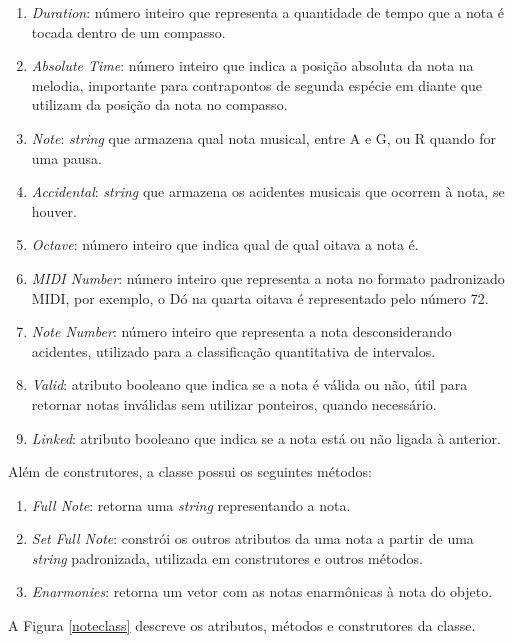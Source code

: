       \begin{enumerate}
        \item \textit{Duration}: número inteiro que representa a quantidade de tempo que a nota é tocada dentro de um compasso.
        \item \textit{Absolute Time}: número inteiro que indica a posição absoluta da nota na melodia, importante para contrapontos de segunda espécie em diante que utilizam da posição da nota no compasso.
        \item \textit{Note}: \textit{string} que armazena qual nota musical, entre A e G, ou R quando for uma pausa.
        \item \textit{Accidental}: \textit{string} que armazena os acidentes musicais que ocorrem à nota, se houver.
        \item \textit{Octave}: número inteiro que indica qual de qual oitava a nota é.
        \item \textit{MIDI Number}: número inteiro que representa a nota no formato padronizado MIDI, por exemplo, o Dó na quarta oitava é representado pelo número 72.
        \item \textit{Note Number}: número inteiro que representa a nota desconsiderando acidentes, utilizado para a classificação quantitativa de intervalos.
        \item \textit{Valid}: atributo booleano que indica se a nota é válida ou não, útil para retornar notas inválidas sem utilizar ponteiros, quando necessário.
        \item \textit{Linked}: atributo booleano que indica se a nota está ou não ligada à anterior.
      \end{enumerate}

      Além de construtores, a classe possui os seguintes métodos:

      \begin{enumerate}
        \item \textit{Full Note}: retorna uma \textit{string} representando a nota.
        \item \textit{Set Full Note}: constrói os outros atributos da uma nota a partir de uma \textit{string} padronizada, utilizada em construtores e outros métodos.
        \item \textit{Enarmonies}: retorna um vetor com as notas enarmônicas à nota do objeto.
      \end{enumerate}

      A Figura \ref{noteclass} descreve os atributos, métodos e construtores da classe.

